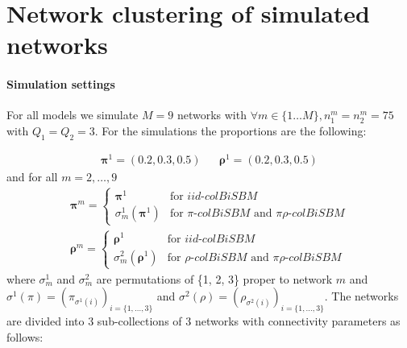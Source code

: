 \section{Network clustering of simulated networks}\label{sec:network-clustering-of-simulated-networks}

\paragraph{Simulation settings}

For all models we simulate \(M = 9\) networks with
\(\forall m \in \{ 1 \dots M \} , n^m_1 = n^m_2 = 75\) with
\(Q_1 = Q_2 = 3\). For the simulations the proportions are the
following:

\begin{align*}
\bm{\pi}^1 = \left( 0.2, 0.3, 0.5 \right) & &  \bm{\rho}^1 = \left( 0.2, 0.3, 0.5 \right)
\end{align*} and for all \(m = 2,\dots,9\) \begin{align*}
\bm{\pi}^m = \begin{cases}
    \bm{\pi}^1 & \text{for } iid\text{-}colBiSBM \\
    \sigma^1_m(\bm{\pi}^1) & \text{for } \pi\text{-}colBiSBM \text{ and } \pi\rho\text{-}colBiSBM
\end{cases}\\
\bm{\rho}^m =
\begin{cases}
    \bm{\rho}^1 & \text{for } iid\text{-}colBiSBM \\
    \sigma^2_m(\bm{\rho}^1) & \text{for } \rho\text{-}colBiSBM \text{ and } \pi\rho\text{-}colBiSBM
\end{cases}
\end{align*} where \(\sigma^1_m\) and \(\sigma^2_m\) are permutations of
\{1, 2, 3\} proper to network \(m\) and
\(\sigma^1 (\pi)= {(\pi_{\sigma^1 (i)})}_{i=\{1,\dots,3\}}\) and
\(\sigma^2 (\rho)= {(\rho_{\sigma^2 (i)})}_{i=\{1,\dots,3\}}\). The
networks are divided into 3 sub-collections of 3 networks with
connectivity parameters as follows:


